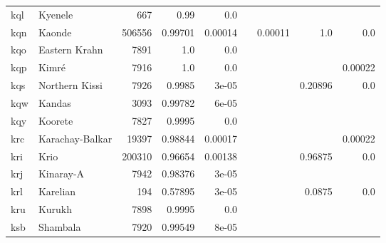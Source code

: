 \documentclass[11pt]{article}
\begin{document}
\begin{table*}[h]
{\begin{tabular}{llrrrrrrr}
kql         & Kyenele         & 667         & 0.99         & 0.0         &          &          &          &          \\

kqn         & Kaonde         & 506556         & 0.99701         & 0.00014         &          & 0.00011         & 1.0         & 0.0         \\

kqo         & Eastern Krahn         & 7891         & 1.0         & 0.0         &          &          &          &          \\

kqp         & Kimré         & 7916         & 1.0         & 0.0         &          &          &          & 0.00022         \\

kqs         & Northern Kissi         & 7926         & 0.9985         & 3e-05         &          &          & 0.20896         & 0.0         \\

kqw         & Kandas         & 3093         & 0.99782         & 6e-05         &          &          &          &          \\

kqy         & Koorete         & 7827         & 0.9995         & 0.0         &          &          &          &          \\

krc         & Karachay-Balkar         & 19397         & 0.98844         & 0.00017         &          &          &          & 0.00022         \\

kri         & Krio         & 200310         & 0.96654         & 0.00138         &          &          & 0.96875         & 0.0         \\

krj         & Kinaray-A         & 7942         & 0.98376         & 3e-05         &          &          &          &          \\

krl         & Karelian         & 194         & 0.57895         & 3e-05         &          &          & 0.0875         & 0.0         \\

kru         & Kurukh         & 7898         & 0.9995         & 0.0         &          &          &          &          \\

ksb         & Shambala         & 7920         & 0.99549         & 8e-05         &          &          &          &          \\


\end{tabular}}
\end{table*}
\end{document}
